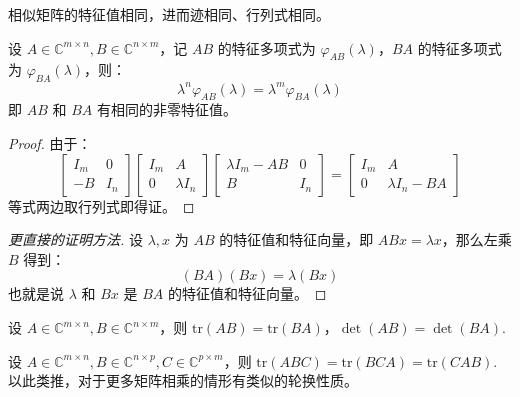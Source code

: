 \begin{corollary}
\label{thm:sim-eigenvalue}
相似矩阵的特征值相同，进而迹相同、行列式相同。
\end{corollary}

\begin{theorem}[$AB$ 和 $BA$ 有相同的非零特征值]
\label{thm:eigen-ab-ba}
设 $A\in\mathbb C^{m\times n},B\in\mathbb C^{n\times m}$，记 $AB$ 的特征多项式为 $\varphi_{AB}(\lambda)$，$BA$ 的特征多项式为 $\varphi_{BA}(\lambda)$，则：
\[
    \lambda^n\varphi_{AB}(\lambda)=\lambda^m\varphi_{BA}(\lambda)
\]
即 $AB$ 和 $BA$ 有相同的非零特征值。
\end{theorem}
\begin{proof}
由于：
\[
    \begin{bmatrix}I_m&0\\-B&I_n\end{bmatrix}\begin{bmatrix}I_m&A\\0&\lambda I_n\end{bmatrix}\begin{bmatrix}\lambda I_m-AB&0\\B&I_n\end{bmatrix}=\begin{bmatrix}I_m&A\\0&\lambda I_n-BA\end{bmatrix}
\]
等式两边取行列式即得证。
\end{proof}
\begin{proof}[更直接的证明方法]
设 $\lambda,x$ 为 $AB$ 的特征值和特征向量，即 $ABx=\lambda x$，那么左乘 $B$ 得到：\[(BA)(Bx)=\lambda (Bx)\]
也就是说 $\lambda$ 和 $Bx$ 是 $BA$ 的特征值和特征向量。
\end{proof}

\begin{corollary}
设 $A\in\mathbb C^{m\times n},B\in\mathbb C^{n\times m}$，则 $\text{tr}(AB)=\text{tr}(BA)$，$\det(AB)=\det(BA)$.
\end{corollary}

\begin{corollary}
\label{cor:trace}
设 $A\in\mathbb C^{m\times n},B\in\mathbb C^{n\times p},C\in\mathbb C^{p\times m}$，则 $\text{tr}(ABC)=\text{tr}(BCA)=\text{tr}(CAB)$. 以此类推，对于更多矩阵相乘的情形有类似的轮换性质。
\end{corollary}

